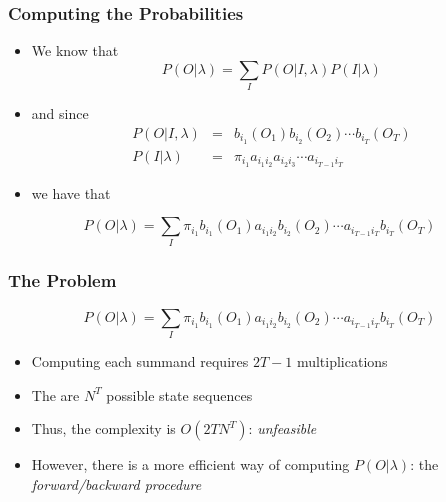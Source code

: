 \documentclass{beamer}
\begin{document}
\begin{frame} \frametitle{Computing the Probabilities}

  \begin{itemize}
  \item We know that
    \begin{displaymath}
      P(O|\lambda) = \sum_I P(O|I,\lambda) P(I|\lambda)
    \end{displaymath}
  \item and since
    \begin{eqnarray*}
      P(O|I,\lambda) & = & b_{i_1}(O_1)b_{i_2}(O_2) \dotsb b_{i_T}(O_T) \\
      P(I|\lambda) & = & \pi_{i_1}a_{i_1i_2}a_{i_2i_3} \dotsb a_{i_{T-1}i_T}
    \end{eqnarray*}
  \item we have that
  \end{itemize}
  \begin{block}{}
    \begin{displaymath}
      P(O|\lambda) = \sum_I \pi_{i_1}b_{i_1}(O_1)a_{i_1i_2}b_{i_2}(O_2) \dotsb a_{i_{T-1}i_T}b_{i_T}(O_T)
    \end{displaymath}
  \end{block}
  
\end{frame}


\begin{frame} \frametitle{The Problem}

  \begin{block}{}
    \begin{displaymath}
      P(O|\lambda) = \sum_I \pi_{i_1}b_{i_1}(O_1)a_{i_1i_2}b_{i_2}(O_2) \dotsb a_{i_{T-1}i_T}b_{i_T}(O_T)
    \end{displaymath}
  \end{block}

  \begin{itemize}
  \item Computing each summand requires $2T-1$ multiplications
  \item The are $N^T$ possible state sequences
  \item Thus, the complexity is $O(2TN^T)$: \emph{unfeasible}
  \item However, there is a more efficient way of computing $P(O|\lambda)$: the
    \emph{forward/backward procedure}
  \end{itemize}
  
\end{frame}
\end{document}
